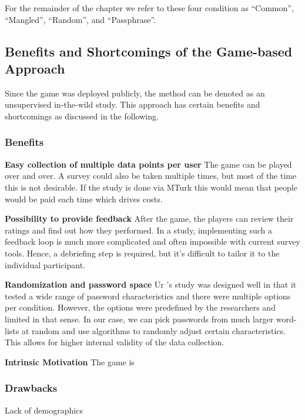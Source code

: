 \vspace*{2ex}
For the remainder of the chapter we refer to these four condition as ``Common'', ``Mangled'', ``Random'', and ``Passphrase''.


\subsection{Benefits and Shortcomings of the Game-based Approach}
Since the game was deployed publicly, the method can be denoted as an unsupervised in-the-wild study. This approach has certain benefits and shortcomings as discussed in the following. 

\subsubsection{Benefits}
\textbf{Easy collection of multiple data points per user} The game can be played over and over. A survey could also be taken multiple times, but most of the time this is not desirable. If the study is done via MTurk this would mean that people would be paid each time which drives costs.

\vspace*{1ex}
\noindent\textbf{Possibility to provide feedback} After the game, the players can review their ratings and find out how they performed. In a study, implementing such a feedback loop is much more complicated and often impossible with current survey tools. Hence, a debriefing step is required, but it's difficult to tailor it to the individual participant.

\vspace*{1ex}
\noindent\textbf{Randomization and password space} Ur \etal's study was designed well in that it tested a wide range of password characteristics and there were multiple options per condition. However, the options were predefined by the researchers and limited in that sense. In our case, we can pick passwords from much larger word-lists at random and use algorithms to randomly adjust certain characteristics. This allows for higher internal validity of the data collection.

\vspace*{1ex}
\noindent\textbf{Intrinsic Motivation} The game is 

\subsubsection{Drawbacks}

Lack of demographics

